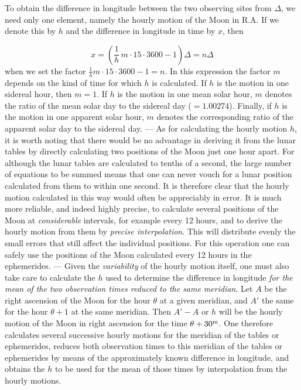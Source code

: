 To obtain the difference in longitude between the two observing sites from $\Delta$, we need only one element, namely the hourly motion of the Moon in R.A. If we denote this by $h$ and the difference in longitude in time by $x$, then

\[
x = \left(\frac{1}{h}\,m\cdot 15\cdot 3600 - 1\right)\Delta = n\Delta
\]
\noindent when we set the factor $\frac{1}{h}m\cdot15\cdot3600-1=n$. In this expression the factor $m$ depends on the kind of time for which $h$ is calculated. If $h$ is the motion in one sidereal hour, then $m=1$. If $h$ is the motion in one mean solar hour, $m$ denotes the ratio of the mean solar day to the sidereal day ($=1.00274$). Finally, if $h$ is the motion in one apparent solar hour, $m$ denotes the corresponding ratio of the apparent solar day to the sidereal day. --- As for calculating the hourly motion $h$, it is worth noting that there would be no advantage in deriving it from the lunar tables by directly calculating two positions of the Moon just one hour apart. For although the lunar tables are calculated to tenths of a second, the large number of equations to be summed means that one can never vouch for a lunar position calculated from them to within one second. It is therefore clear that the hourly motion calculated in this way would often be appreciably in error. It is much more reliable, and indeed highly precise, to calculate several positions of the Moon at \emph{considerable} intervals, for example every 12 hours, and to derive the hourly motion from them by \emph{precise interpolation}. This will distribute evenly the small errors that still affect the individual positions. For this operation one can safely use the positions of the Moon calculated every 12 hours in the ephemerides. --- Given the \emph{variability} of the hourly motion itself, one must also take care to calculate the $h$ used to determine the difference in longitude \emph{for the mean of the two observation times reduced to the same meridian}. Let $A$ be the right ascension of the Moon for the hour $\theta$ at a given meridian, and $A'$ the same for the hour $\theta+1$ at the same meridian. Then $A'-A$ or $h$ will be the hourly motion of the Moon in right ascension for the time $\theta+30^{\rm m}$. One therefore calculates several successive hourly motions for the meridian of the tables or ephemerides, reduces both observation times to this meridian of the tables or ephemerides by means of the approximately known difference in longitude, and obtains the $h$ to be used for the mean of those times by interpolation from the hourly motions.

